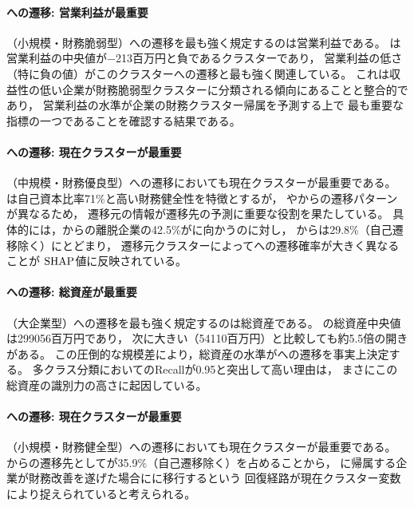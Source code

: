 \paragraph{への遷移: 営業利益が最重要}
（小規模・財務脆弱型）への遷移を最も強く規定するのは営業利益である。
は営業利益の中央値が$-$\num{213}百万円と負であるクラスターであり，
営業利益の低さ（特に負の値）がこのクラスターへの遷移と最も強く関連している。
これは収益性の低い企業が財務脆弱型クラスターに分類される傾向にあることと整合的であり，
営業利益の水準が企業の財務クラスター帰属を予測する上で
最も重要な指標の一つであることを確認する結果である。

\paragraph{への遷移: 現在クラスターが最重要}
（中規模・財務優良型）への遷移においても現在クラスターが最重要である。
は自己資本比率71\%と高い財務健全性を特徴とするが，
やからの遷移パターンが異なるため，
遷移元の情報が遷移先の予測に重要な役割を果たしている。
具体的には，からの離脱企業の42.5\%がに向かうのに対し，
からは29.8\%（自己遷移除く）にとどまり，
遷移元クラスターによってへの遷移確率が大きく異なることが
$\mathrm{SHAP}$値に反映されている。

\paragraph{への遷移: 総資産が最重要}
（大企業型）への遷移を最も強く規定するのは総資産である。
の総資産中央値は\num{299056}百万円であり，
次に大きい（\num{54110}百万円）と比較しても約5.5倍の開きがある。
この圧倒的な規模差により，総資産の水準がへの遷移を事実上決定する。
多クラス分類においてのRecallが0.95と突出して高い理由は，
まさにこの総資産の識別力の高さに起因している。

\paragraph{への遷移: 現在クラスターが最重要}
（小規模・財務健全型）への遷移においても現在クラスターが最重要である。
からの遷移先としてが35.9\%（自己遷移除く）を占めることから，
に帰属する企業が財務改善を遂げた場合にに移行するという
回復経路が現在クラスター変数により捉えられていると考えられる。

